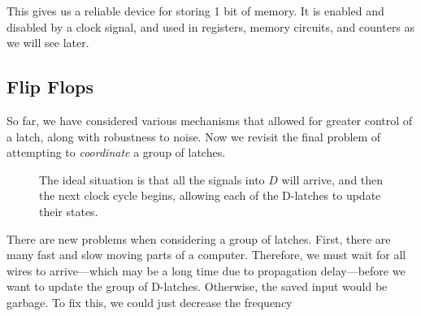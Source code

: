 \begin{definition}
\begin{figure}[H]
      \caption{} 
    \end{figure}
  \end{definition}

  This gives us a reliable device for storing 1 bit of memory. It is enabled and disabled by a clock signal, and used in registers, memory circuits, and counters as we will see later. 

\subsection{Flip Flops}

  So far, we have considered various mechanisms that allowed for greater control of a latch, along with robustness to noise. Now we revisit the final problem of attempting to \textit{coordinate} a group of latches. 

  \begin{figure}[H]
    \centering 
    \caption{The ideal situation is that all the signals into $D$ will arrive, and then the next clock cycle begins, allowing each of the D-latches to update their states.} 
  \end{figure}

  There are new problems when considering a group of latches. First, there are many fast and slow moving parts of a computer. Therefore, we must wait for all wires to arrive---which may be a long time due to propagation delay---before we want to update the group of D-latches. Otherwise, the saved input would be garbage. To fix this, we could just decrease the frequency 

